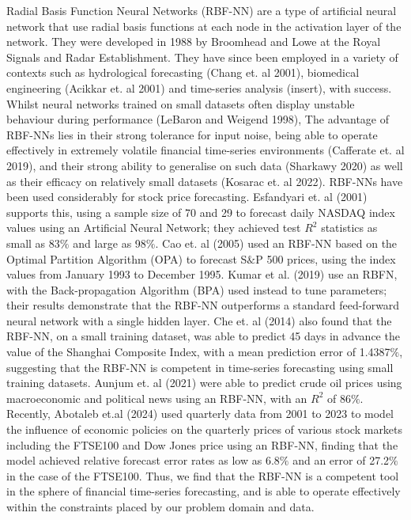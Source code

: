\documentclass[12pt,a4paper]{article}
\begin{document}
Radial Basis Function Neural Networks (RBF-NN) are a type of artificial 
neural network that use radial basis functions at each node in the 
activation layer of the network. They were developed in 1988 by 
Broomhead and Lowe at the Royal Signals and Radar Establishment. 
They have since been employed in a variety of contexts such as 
hydrological forecasting (Chang et. al 2001), biomedical engineering 
(Acikkar et. al 2001) and time-series analysis (insert), with success. 
Whilst neural networks trained on small datasets often display unstable 
behaviour during performance (LeBaron and Weigend 1998), The advantage of 
RBF-NNs lies in their strong tolerance for input noise, being able to 
operate effectively in extremely volatile financial time-series 
environments (Cafferate et. al 2019), and their strong ability to 
generalise on such data (Sharkawy 2020) as well as their efficacy on 
relatively small datasets (Kosarac et. al 2022). RBF-NNs have been used 
considerably for stock price forecasting. Esfandyari et. al (2001) 
supports this, using a sample size of 70 and 29 to forecast daily NASDAQ 
index values using an Artificial Neural Network; they achieved test $R^2$
statistics as small as 83$\%$ and large as 98$\%$. Cao et. al (2005) 
used an RBF-NN based on the Optimal Partition Algorithm (OPA) to 
forecast S$\&$P 500 prices, using the index values from January 1993 to 
December 1995. Kumar et al. (2019) use an RBFN, with the Back-propagation 
Algorithm (BPA) used instead to tune parameters; their results demonstrate 
that the RBF-NN outperforms a standard feed-forward neural network with a 
single hidden layer. Che et. al (2014) also found that the RBF-NN, on a 
small training dataset, was able to predict 45 days in advance the value 
of the Shanghai Composite Index, with a mean prediction error of 
1.4387$\%$, suggesting that the RBF-NN is competent in time-series 
forecasting using small training datasets. Aunjum et. al (2021) were 
able to predict crude oil prices using macroeconomic and political news 
using an RBF-NN, with an $R^2$ of 86$\%$. Recently, Abotaleb et.al (2024)
used quarterly data from 2001 to 2023 to model the influence of economic 
policies on the quarterly prices of various stock markets including the 
FTSE100 and Dow Jones price using an RBF-NN, finding that the model 
achieved relative forecast error rates as low as 6.8$\%$ and an error of 
27.2$\%$ in the case of the FTSE100. Thus, we find that the RBF-NN is a 
competent tool in the sphere of financial time-series forecasting, and 
is able to operate effectively within the constraints placed by our 
problem domain and data.
\end{document}
